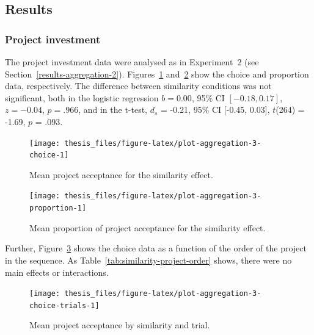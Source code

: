 \documentclass[a4paper, nobind, dvipsnames]{templates/ociamthesis}
\theoremstyle{definition}
\theoremstyle{definition}
\theoremstyle{definition}
\theoremstyle{definition}
\theoremstyle{remark}
\begin{document}
\subsection{Results}

\subsubsection{Project investment}

The project investment data were analysed as in Experiment~2 (see
Section~\ref{results-aggregation-2}).
Figures~\ref{fig:plot-aggregation-3-choice}
and~\ref{fig:plot-aggregation-3-proportion} show the choice and proportion
data, respectively. The difference between similarity conditions was not
significant, both in the logistic regression
\(b = 0.00\), 95\% CI \([-0.18, 0.17]\), \(z = -0.04\), \(p = .966\), and in the t-test,
\(d_s\) = -0.21, 95\% CI {[}-0.45, 0.03{]}, \(t\)(264) = -1.69, \(p\) = .093.



\begin{figure}
\texttt{[image: thesis\_files/figure-latex/plot-aggregation-3-choice-1]} \caption{Mean project acceptance for the similarity effect.}\label{fig:plot-aggregation-3-choice}
\end{figure}



\begin{figure}
\texttt{[image: thesis\_files/figure-latex/plot-aggregation-3-proportion-1]} \caption{Mean proportion of project acceptance for the similarity effect.}\label{fig:plot-aggregation-3-proportion}
\end{figure}

Further, Figure~\ref{fig:plot-aggregation-3-choice-trials} shows the choice
data as a function of the order of the project in the sequence. As
Table~\ref{tab:similarity-project-order} shows, there were no main effects or
interactions.



\begin{figure}
\texttt{[image: thesis\_files/figure-latex/plot-aggregation-3-choice-trials-1]} \caption{Mean project acceptance by similarity and trial.}\label{fig:plot-aggregation-3-choice-trials}
\end{figure}
\end{document}
